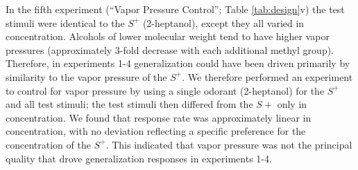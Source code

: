 In the fifth experiment (``Vapor Pressure Control''; Table \ref{tab:design}v) the test stimuli were identical to the $S^+$ (2-heptanol), except they all varied in concentration.  
Alcohols of lower molecular weight tend to have higher vapor pressures (approximately 3-fold decrease with each additional methyl group).  
Therefore, in experiments 1-4 generalization could have been driven primarily by similarity to the vapor pressure of the $S^+$.  
We therefore performed an experiment to control for vapor pressure by using a single odorant (2-heptanol) for the $S^+$ and all test stimuli; the test stimuli then differed from the $S+$ only in concentration.  
We found that response rate was approximately linear in concentration, with no deviation reflecting a specific preference for the concentration of the $S^+$.  
This indicated that vapor pressure was not the principal quality that drove generalization responses in experiments 1-4.  
